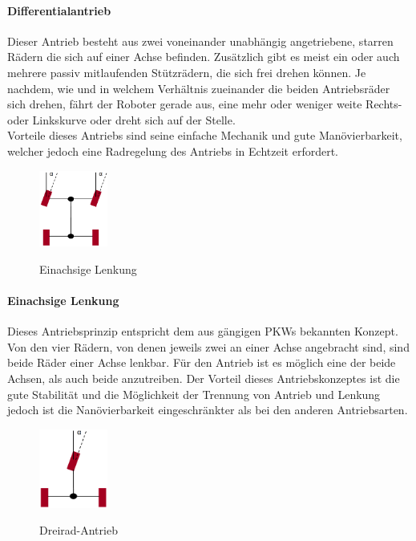 \paragraph{Differentialantrieb}
Dieser Antrieb besteht aus zwei voneinander unabhängig angetriebene, starren Rädern die sich auf einer Achse befinden. Zusätzlich gibt es meist ein oder auch mehrere passiv mitlaufenden Stützrädern, die sich frei drehen können. Je nachdem, wie und in welchem Verhältnis zueinander die beiden Antriebsräder sich drehen, fährt der Roboter gerade aus, eine mehr oder weniger weite Rechts- oder Linkskurve oder dreht sich auf der Stelle.\\
Vorteile dieses Antriebs sind seine einfache Mechanik und gute Manövierbarkeit, welcher jedoch eine Radregelung des Antriebs in Echtzeit erfordert.
\begin{figure}
	\vspace{-0.25cm}
	\begin{center}
		\includegraphics[width=0.20\textwidth]{images/technische_grundlagen/Einachsenlenkung.png}
	\end{center}
	\caption{Einachsige Lenkung}
	\cite{MarkusStrand.Robotikscript}
	\label{fig:einachsenlenkung}
\end{figure}
\paragraph{Einachsige Lenkung}
Dieses Antriebsprinzip entspricht dem aus gängigen PKWs bekannten Konzept. Von den vier Rädern, von denen jeweils zwei an einer Achse angebracht sind, sind beide Räder einer Achse lenkbar. Für den Antrieb ist es möglich eine der beide Achsen, als auch beide anzutreiben. 
\newline
Der Vorteil dieses Antriebskonzeptes ist die gute Stabilität und die Möglichkeit der Trennung von Antrieb und Lenkung jedoch ist die Nanövierbarkeit eingeschränkter als bei den anderen Antriebsarten.
\begin{figure}
	\vspace{+0.25cm}
	\begin{center}
		\includegraphics[width=0.20\textwidth]{images/technische_grundlagen/Dreiradantrieb.png}
	\end{center}
	\caption{Dreirad-Antrieb}
	\cite{MarkusStrand.Robotikscript}
	\label{fig:einachsenlenkung}
\end{figure}
